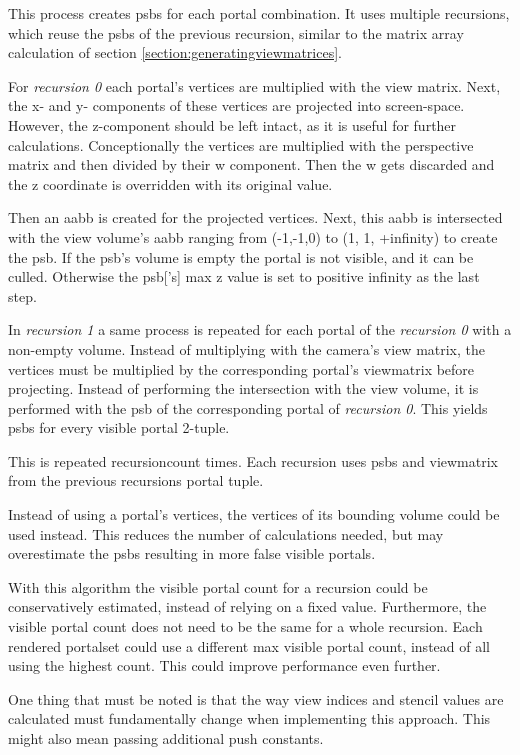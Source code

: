 This process creates \glspl{psb} for each portal combination. It uses multiple recursions, which reuse the \glspl{psb} of the previous recursion, similar to the matrix array calculation of section \ref{section:generatingviewmatrices}.

For \textit{recursion 0} each portal's vertices are multiplied with the view matrix. Next, the x- and y- components of these vertices are projected into screen-space. However, the z-component should be left intact, as it is useful for further calculations. Conceptionally the vertices are multiplied with the perspective matrix and then divided by their w component. Then the w gets discarded and the z coordinate is overridden with its original value.

Then an \gls{aabb} is created for the projected vertices. Next, this \gls{aabb} is intersected with the view volume's  \gls{aabb} ranging from (-1,-1,0) to (1, 1, +infinity) to create the \gls{psb}. If the \gls{psb}'s volume is empty the portal is not visible, and it can be culled. Otherwise the \gls{psb}['s] max z value is set to positive infinity as the last step.

In \textit{recursion 1} a same process is repeated for each portal of the \textit{recursion 0} with a non-empty volume. Instead of multiplying with the camera's view matrix, the vertices must be multiplied by the corresponding portal's \gls{viewmatrix} before projecting. Instead of performing the intersection with the view volume, it is performed with the \gls{psb} of the corresponding portal of \textit{recursion 0}. This yields \glspl{psb} for every visible portal 2-tuple.

This is repeated \gls{recursioncount} times. Each recursion uses \glspl{psb} and \gls{viewmatrix} from the previous recursions portal tuple. 

Instead of using a portal's vertices, the vertices of its bounding volume could be used instead. This reduces the number of calculations needed, but may overestimate the \glspl{psb} resulting in more false visible portals.

With this algorithm the visible portal count for a recursion could be conservatively estimated, instead of relying on a fixed value. Furthermore, the visible portal count does not need to be the same for a whole recursion. Each rendered \gls{portalset} could use a different max visible portal count, instead of all using the highest count. This could improve performance even further.

One thing that must be noted is that the way view indices and stencil values are calculated must fundamentally change when implementing this approach. This might also mean passing additional push constants.

